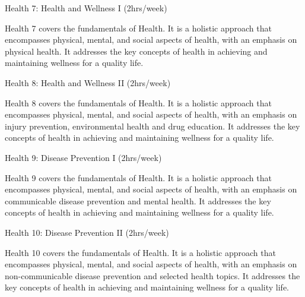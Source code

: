 \begin{subject}
	Health 7: Health and Wellness I 
	\hfill
	(2hrs/week)
\end{subject}
Health 7 covers the fundamentals of Health. It is a holistic approach that encompasses physical, mental, and social aspects of health, with an emphasis on physical health. It addresses the key concepts of health in achieving and maintaining wellness for a quality life.


\begin{subject}
	Health 8: Health and Wellness II
	\hfill
	(2hrs/week)
\end{subject}
Health 8 covers the fundamentals of Health. It is a holistic approach that encompasses physical, mental, and social aspects of health, with an emphasis on injury prevention, environmental health and drug education. It addresses the key concepts of health in achieving and maintaining wellness for a quality life.


\begin{subject}
	Health 9: Disease Prevention I
	\hfill
	(2hrs/week)
\end{subject}
Health 9 covers the fundamentals of Health. It is a holistic approach that encompasses physical, mental, and social aspects of health, with an emphasis on communicable disease prevention and mental health. It addresses the key concepts of health in achieving and maintaining wellness for a quality life.

\begin{subject}
	Health 10: Disease Prevention II
	\hfill
	(2hrs/week)
\end{subject}
Health 10 covers the fundamentals of Health. It is a holistic approach that encompasses physical, mental, and social aspects of health, with an emphasis on non-communicable disease prevention and selected health topics. It addresses the key concepts of health in achieving and maintaining wellness for a quality life.
